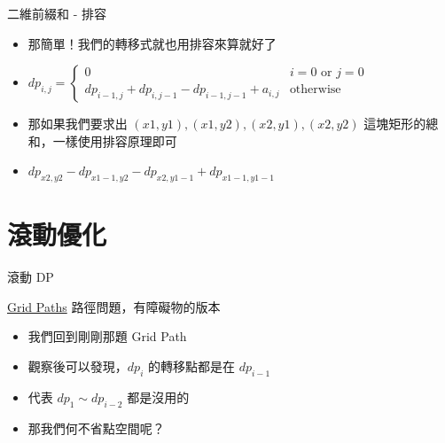 \documentclass[aspectratio=169]{beamer}
\begin{document}
    \begin{frame}{二維前綴和 - 排容}
        \begin{itemize}
            \item<1-> 那簡單！我們的轉移式就也用排容來算就好了
            \item<2-> $dp_{i, j} = \begin{cases}
                0 & i = 0 \text{ or } j = 0 \\
                dp_{i - 1, j} + dp_{i, j - 1} - dp_{i - 1, j - 1} + a_{i, j} & \text{otherwise}
            \end{cases}$
            \item<3-> 那如果我們要求出 $(x1, y1), (x1, y2), (x2, y1), (x2, y2)$ 這塊矩形的總和，一樣使用排容原理即可
            \item<4-> $dp_{x2, y2} - dp_{x1 - 1, y2} - dp_{x2, y1 - 1} + dp_{x1 - 1, y1 - 1}$
        \end{itemize}
    \end{frame}

    \section{滾動優化}

    \begin{frame}{滾動 DP}
        \begin{block}{\href{https://cses.fi/problemset/task/1638}{Grid Paths}}
            路徑問題，有障礙物的版本
        \end{block}

        \begin{itemize}
            \item<1-> 我們回到剛剛那題 Grid Path
            \item<2-> 觀察後可以發現，$dp_i$ 的轉移點都是在 $dp_{i - 1}$
            \item<2-> 代表 $dp_1 \sim dp_{i - 2}$ 都是沒用的
            \item<3-> 那我們何不省點空間呢？
        \end{itemize}
    \end{frame}
\end{document}
